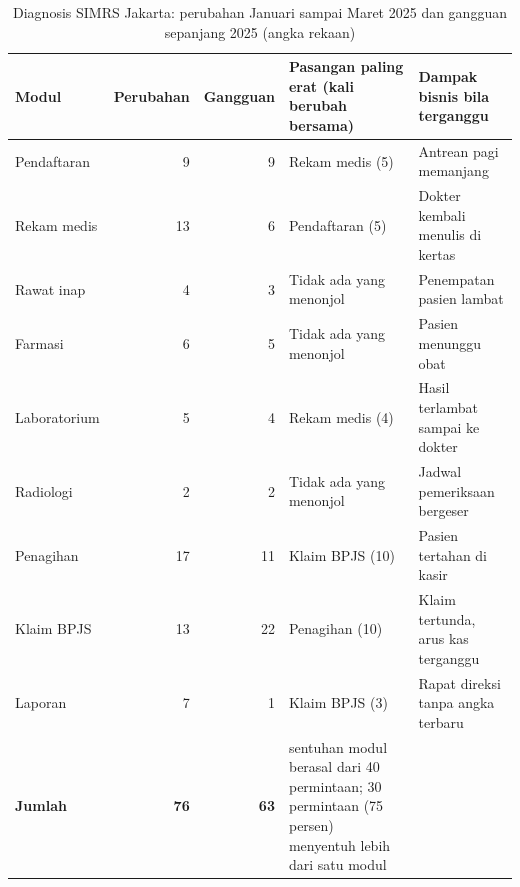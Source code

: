 \begin{table}[!htb]
  \centering
  \caption{Diagnosis SIMRS Jakarta: perubahan Januari sampai Maret 2025 dan
           gangguan sepanjang 2025 (angka rekaan)}
  \label{tab:ch07-diagnosis-simrs}
  \footnotesize
  \begin{tabularx}{\textwidth}{>{\raggedright\arraybackslash}p{2.0cm} r r >{\raggedright\arraybackslash}X >{\raggedright\arraybackslash}X}
    \hline
    \textbf{Modul} & \textbf{Perubahan} & \textbf{Gangguan} & \textbf{Pasangan paling erat
      (kali berubah bersama)} & \textbf{Dampak bisnis bila terganggu} \\ \hline
    Pendaftaran & 9 & 9 & Rekam medis (5) & Antrean pagi memanjang \\ \hline
    Rekam medis & 13 & 6 & Pendaftaran (5) & Dokter kembali menulis di kertas \\ \hline
    Rawat inap & 4 & 3 & Tidak ada yang menonjol & Penempatan pasien lambat \\ \hline
    Farmasi & 6 & 5 & Tidak ada yang menonjol & Pasien menunggu obat \\ \hline
    Laboratorium & 5 & 4 & Rekam medis (4) & Hasil terlambat sampai ke dokter \\ \hline
    Radiologi & 2 & 2 & Tidak ada yang menonjol & Jadwal pemeriksaan bergeser \\ \hline
    Penagihan & 17 & 11 & Klaim BPJS (10) & Pasien tertahan di kasir \\ \hline
    Klaim BPJS & 13 & 22 & Penagihan (10) & Klaim tertunda, arus kas terganggu \\ \hline
    Laporan & 7 & 1 & Klaim BPJS (3) & Rapat direksi tanpa angka terbaru \\ \hline
    \textbf{Jumlah} & \textbf{76} & \textbf{63} & 76 sentuhan modul berasal dari 40 permintaan;
      30 permintaan (75 persen) menyentuh lebih dari satu modul & \\ \hline
  \end{tabularx}
\end{table}

